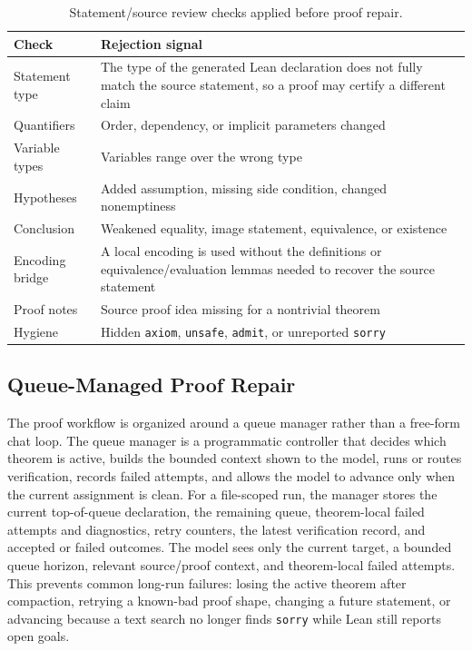 \documentclass{article}
\newcommand{\lean}{Lean\xspace}
\begin{document}
\begin{table}[t]
\centering
\caption{Statement/source review checks applied before proof repair.}
\label{tab:review-checks}
\footnotesize
\setlength{\tabcolsep}{3pt}
\begin{tabular}{p{}p{}}
\toprule
Check & Rejection signal \\
\midrule
Statement type & The type of the generated \lean declaration does not fully match the source statement, so a proof may certify a different claim \\
Quantifiers & Order, dependency, or implicit parameters changed \\
Variable types & Variables range over the wrong type \\
Hypotheses & Added assumption, missing side condition, changed nonemptiness \\
Conclusion & Weakened equality, image statement, equivalence, or existence \\
Encoding bridge & A local encoding is used without the definitions or equivalence/evaluation lemmas needed to recover the source statement \\
Proof notes & Source proof idea missing for a nontrivial theorem \\
Hygiene & Hidden \texttt{axiom}, \texttt{unsafe}, \texttt{admit}, or unreported \texttt{sorry} \\
\bottomrule
\end{tabular}
\end{table}

\subsection{Queue-Managed Proof Repair}

The proof workflow is organized around a queue manager rather than a free-form chat loop.
The queue manager is a programmatic controller that decides which theorem is active, builds the bounded context shown to the model, runs or routes verification, records failed attempts, and allows the model to advance only when the current assignment is clean.
For a file-scoped run, the manager stores the current top-of-queue declaration, the remaining queue, theorem-local failed attempts and diagnostics, retry counters, the latest verification record, and accepted or failed outcomes.
The model sees only the current target, a bounded queue horizon, relevant source/proof context, and theorem-local failed attempts.
This prevents common long-run failures: losing the active theorem after compaction, retrying a known-bad proof shape, changing a future statement, or advancing because a text search no longer finds \texttt{sorry} while \lean still reports open goals.
\end{document}
